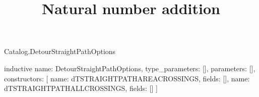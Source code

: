 \begin{lexlean}{Catalog.DetourStraightPathOptions}
\title{Natural number addition}
\begin{semanticmodule}
inductive{
  name: DetourStraightPathOptions,
  type_parameters: [],
  parameters: [],
  constructors: [
    {name: dTSTRAIGHTPATHAREACROSSINGS, fields: []},
    {name: dTSTRAIGHTPATHALLCROSSINGS, fields: []}
  ]
}
\end{semanticmodule}
\end{lexlean}
